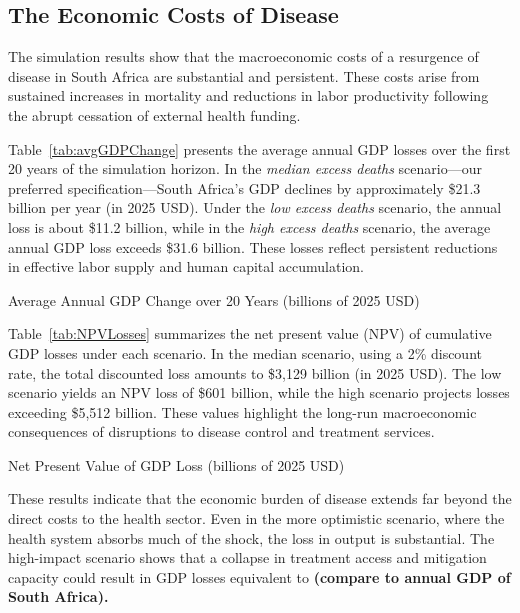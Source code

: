 \documentclass[letterpaper,12pt]{article}
\theoremstyle{definition}
\begin{document}
\begin{spacing}{1.5}
\section{The Economic Costs of Disease}\label{SecResults}

The simulation results show that the macroeconomic costs of a resurgence of disease in South Africa are substantial and persistent. These costs arise from sustained increases in mortality and reductions in labor productivity following the abrupt cessation of external health funding.

Table~\ref{tab:avgGDPChange} presents the average annual GDP losses over the first 20 years of the simulation horizon. In the \textit{median excess deaths} scenario—our preferred specification—South Africa’s GDP declines by approximately \$21.3 billion per year (in 2025 USD). Under the \textit{low excess deaths} scenario, the annual loss is about \$11.2 billion, while in the \textit{high excess deaths} scenario, the average annual GDP loss exceeds \$31.6 billion. These losses reflect persistent reductions in effective labor supply and human capital accumulation.

\begin{table}[H]
\centering
\caption{Average Annual GDP Change over 20 Years (billions of 2025 USD)}

\label{tab:avgGDPChange}
\end{table}

Table~\ref{tab:NPVLosses} summarizes the net present value (NPV) of cumulative GDP losses under each scenario. In the median scenario, using a 2\% discount rate, the total discounted loss amounts to \$3,129 billion (in 2025 USD). The low scenario yields an NPV loss of \$601 billion, while the high scenario projects losses exceeding \$5,512 billion. These values highlight the long-run macroeconomic consequences of disruptions to disease control and treatment services.

\begin{table}[H]
\centering
\caption{Net Present Value of GDP Loss (billions of 2025 USD)}

\label{tab:NPVLosses}
\end{table}

These results indicate that the economic burden of disease extends far beyond the direct costs to the health sector. Even in the more optimistic scenario, where the health system absorbs much of the shock, the loss in output is substantial. The high-impact scenario shows that a collapse in treatment access and mitigation capacity could result in GDP losses equivalent to \textbf{(compare to annual GDP of South Africa).}




\end{spacing}
\end{document}
